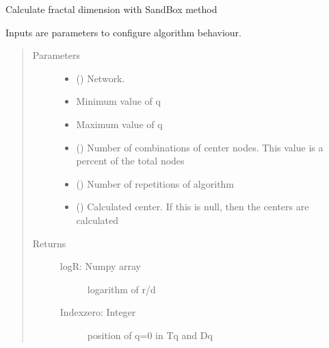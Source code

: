 \documentclass[letterpaper,10pt,english]{sphinxmanual}
\begin{document}
\begin{fulllineitems}
\label{\detokenize{SBAlgorithm:SBAlgorithm.SBAlgorithm.SBAlgorithm}}
Calculate fractal dimension with SandBox method

Inputs are parameters to configure algorithm behaviour.
\begin{quote}\begin{description}
\item[{Parameters}] \leavevmode\begin{itemize}
\item {} 
 () \textendash{} Network.

\item {} 
 \textendash{} Minimum value of q

\item {} 
 \textendash{} Maximum value of q

\item {} 
 () \textendash{} Number of combinations of center nodes. This value is a percent of the total nodes

\item {} 
 () \textendash{} Number of repetitions of algorithm

\item {} 
 () \textendash{} Calculated center. If this is null, then the centers are calculated

\end{itemize}

\item[{Returns}] \leavevmode
\begin{description}
\item[{logR: Numpy array}] \leavevmode
logarithm of r/d

\item[{Indexzero: Integer}] \leavevmode
position of q=0 in Tq and Dq


\end{description}
\end{description}
\end{quote}
\end{fulllineitems}
\end{document}
